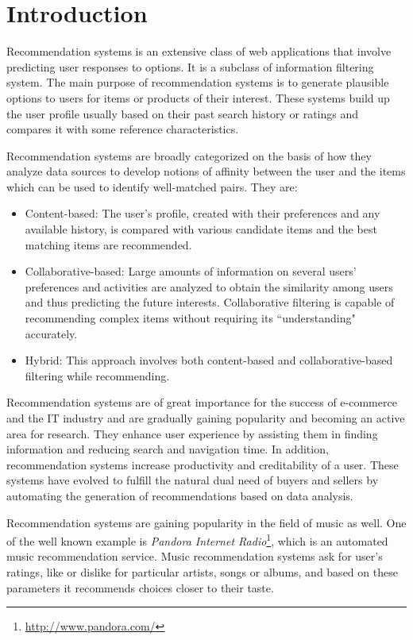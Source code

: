 \chapter{Introduction}
	Recommendation systems is an extensive class of web applications that involve predicting 
user responses to options. It is a subclass of information filtering system. The main purpose of recommendation systems is to generate plausible options to users for items or products of their interest. These systems build up the user profile usually based on their past search history or ratings and compares it with some reference characteristics.

	Recommendation systems are broadly categorized on the basis of how they analyze data sources to develop notions of affinity between the user and the items which can be used to identify well-matched pairs. They are:
\begin{itemize}
	\item Content-based: The user's profile, created with their preferences and any available history, is compared with various candidate items and the best matching items are recommended.
	\item Collaborative-based: Large amounts of information on several users' preferences and activities are analyzed to obtain the similarity among users and thus predicting the future interests. Collaborative filtering is capable of recommending complex items without requiring its ``understanding" accurately.
	\item Hybrid: This approach involves both content-based and collaborative-based filtering while recommending.
\end{itemize}

	Recommendation systems are of great importance for the success of e-commerce and the IT industry and are gradually gaining popularity and becoming an active area for research. They enhance user experience by assisting them in finding information and reducing search and navigation time. In addition, recommendation systems increase productivity and creditability of a user. These systems have evolved to fulfill the natural dual need of buyers and sellers by automating the generation of recommendations based on data analysis.

	Recommendation systems are gaining popularity in the field of music as well. One of the well known example is \emph{Pandora Internet Radio}\footnote{\url{http://www.pandora.com/}}, which is an automated music recommendation service. Music recommendation systems ask for user’s ratings, like or dislike for particular artists, songs or albums, and based on these parameters it recommends choices closer to their taste.

